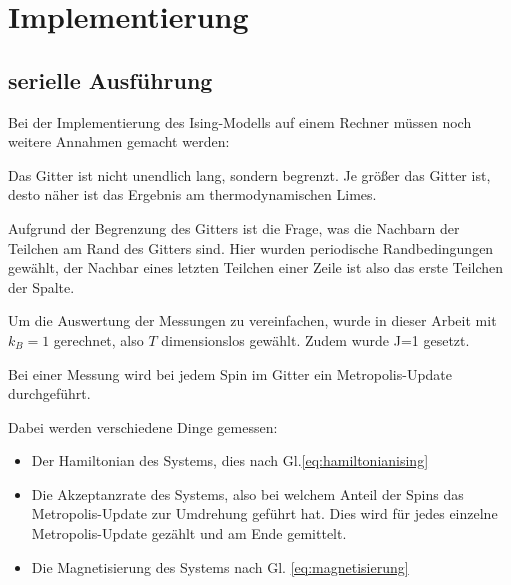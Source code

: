 \documentclass{scrreprt}
\begin{document}
	\chapter{Implementierung}
	\label{chap:implementierung}
	
	\section{serielle Ausführung}
	\label{sec:seriellimplementierung}
	Bei der Implementierung des Ising-Modells auf einem Rechner müssen noch weitere Annahmen gemacht werden:
	
	Das Gitter ist nicht unendlich lang, sondern begrenzt. Je größer das Gitter ist, desto näher ist das Ergebnis am thermodynamischen Limes. 
	
	Aufgrund der Begrenzung des Gitters ist die Frage, was die Nachbarn der Teilchen am Rand des Gitters sind. Hier wurden periodische Randbedingungen gewählt, der Nachbar eines letzten Teilchen einer Zeile ist also das erste Teilchen der Spalte.
	
	Um die Auswertung der Messungen zu vereinfachen, wurde in dieser Arbeit mit $k_B=1$ gerechnet, also $T$ dimensionslos gewählt. Zudem wurde J=1 gesetzt.
	
	Bei einer Messung wird bei jedem Spin im Gitter ein Metropolis-Update durchgeführt.%
	
	Dabei werden verschiedene Dinge gemessen: \begin{itemize}
		\item Der Hamiltonian des Systems, dies nach Gl.\ref{eq:hamiltonianising}
		\item Die Akzeptanzrate des Systems, also bei welchem Anteil der Spins das Metropolis-Update zur Umdrehung geführt hat. Dies wird für jedes einzelne Metropolis-Update gezählt und am Ende gemittelt.
		\item Die Magnetisierung des Systems nach Gl. \ref{eq:magnetisierung}
	\end{itemize}
	
\end{document}
